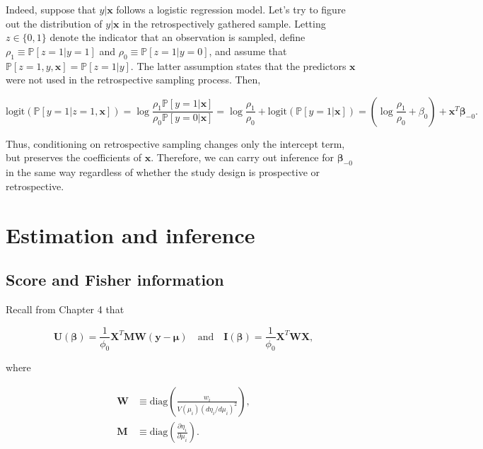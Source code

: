 \documentclass[
  11pt,
  letterpaper,
  oneside]{book}
\theoremstyle{definition}
\theoremstyle{plain}
\theoremstyle{plain}
\theoremstyle{plain}
\theoremstyle{remark}
\begin{document}
Indeed, suppose that \(y|\boldsymbol{x}\) follows a logistic regression
model. Let's try to figure out the distribution of \(y|\boldsymbol{x}\)
in the retrospectively gathered sample. Letting \(z \in \{0,1\}\) denote
the indicator that an observation is sampled, define
\(\rho_1 \equiv \mathbb{P}[z = 1|y = 1]\) and
\(\rho_0 \equiv \mathbb{P}[z = 1|y = 0]\), and assume that
\(\mathbb{P}[z = 1, y, \boldsymbol{x}] = \mathbb{P}[z = 1 | y]\). The
latter assumption states that the predictors \(\boldsymbol{x}\) were not
used in the retrospective sampling process. Then,

\[
\text{logit}(\mathbb{P}[y = 1|z = 1, \boldsymbol{x}]) = \log \frac{\rho_1 \mathbb{P}[y = 1|\boldsymbol{x}]}{\rho_0 \mathbb{P}[y = 0|\boldsymbol{x}]} = \log \frac{\rho_1}{\rho_0} + \text{logit}(\mathbb{P}[y = 1|\boldsymbol{x}]) = \left(\log \frac{\rho_1}{\rho_0} + \beta_0\right) + \boldsymbol{x}^T \boldsymbol{\beta}_{-0}.
\]

Thus, conditioning on retrospective sampling changes only the intercept
term, but preserves the coefficients of \(\boldsymbol{x}\). Therefore,
we can carry out inference for \(\boldsymbol{\beta}_{-0}\) in the same
way regardless of whether the study design is prospective or
retrospective.

\hypertarget{sec-estimation-inference}{%
\section{Estimation and inference}\label{sec-estimation-inference}}

\hypertarget{sec-score-fisher}{%
\subsection{Score and Fisher information}\label{sec-score-fisher}}

Recall from Chapter 4 that

\[
\boldsymbol{U}(\boldsymbol{\beta}) = \frac{1}{\phi_0}\boldsymbol{X}^T \boldsymbol{M} \boldsymbol{W} (\boldsymbol{y} - \boldsymbol{\mu}) \quad \text{and} \quad \boldsymbol{I}(\boldsymbol{\beta}) = \frac{1}{\phi_0}\boldsymbol{X}^T \boldsymbol{W} \boldsymbol{X},
\]

where

\[
\begin{aligned}
\boldsymbol{W} &\equiv \text{diag}\left(\frac{w_i}{V(\mu_i)(d\eta_i/d\mu_i)^2}\right), \\
\boldsymbol{M} &\equiv \text{diag}\left(\frac{\partial\eta_i}{\partial \mu_i}\right).
\end{aligned}
\]
\end{document}

